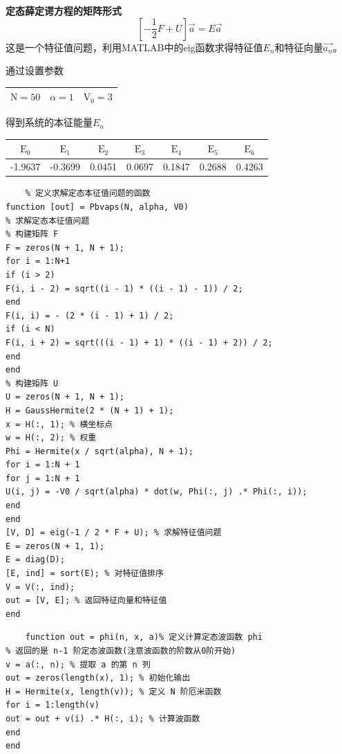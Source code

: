 \documentclass[aspectratio=169]{beamer}
\begin{document}
\begin{frame}{\textbf{定态薛定谔方程的矩阵形式}}
\begin{equation}
        \boxed{ \left[-\frac{1}{2}F+U\right]\vec{a}=E\vec{a}}
\end{equation}
    这是一个特征值问题，利用MATLAB中的eig函数求得特征值$E_n$和特征向量$\vec{a_n}$。
    \begin{exampleblock}{}
        \pause
    通过设置参数
    \begin{table}[h]
        \centering
        \begin{tabular}{|c|c|c|}
        \hline
        $\mathrm{N}=50$ & $\alpha=1$ & $\mathrm{V}_0=3$ \\
        \hline
        \end{tabular}
        
        得到系统的本征能量$E_n$
        \begin{tabular}{|c|c|c|c|c|c|c|}
        \hline
        $\mathrm{E}_0$ & $\mathrm{E}_1$ & $\mathrm{E}_2$ & $\mathrm{E}_3$ & $\mathrm{E}_4$ & $\mathrm{E}_5$ & $\mathrm{E}_6$ \\
        \hline
        -1.9637 & -0.3699 & 0.0451 & 0.0697 & 0.1847 & 0.2688 & 0.4263 \\
        \hline
        \end{tabular}
        \end{table}
    \end{exampleblock}
\end{frame}
\begin{lstlisting}
    % 定义求解定态本征值问题的函数
function [out] = Pbvaps(N, alpha, V0)
% 求解定态本征值问题
% 构建矩阵 F
F = zeros(N + 1, N + 1);
for i = 1:N+1
if (i > 2)
F(i, i - 2) = sqrt((i - 1) * ((i - 1) - 1)) / 2;
end
F(i, i) = - (2 * (i - 1) + 1) / 2;
if (i < N)
F(i, i + 2) = sqrt(((i - 1) + 1) * ((i - 1) + 2)) / 2;
end
end
% 构建矩阵 U
U = zeros(N + 1, N + 1);
H = GaussHermite(2 * (N + 1) + 1); 
x = H(:, 1); % 横坐标点
w = H(:, 2); % 权重
Phi = Hermite(x / sqrt(alpha), N + 1);
for i = 1:N + 1
for j = 1:N + 1
U(i, j) = -V0 / sqrt(alpha) * dot(w, Phi(:, j) .* Phi(:, i));
end
end
[V, D] = eig(-1 / 2 * F + U); % 求解特征值问题
E = zeros(N + 1, 1);
E = diag(D);
[E, ind] = sort(E); % 对特征值排序
V = V(:, ind);
out = [V, E]; % 返回特征向量和特征值
end

\end{lstlisting}
\begin{lstlisting}
    function out = phi(n, x, a)% 定义计算定态波函数 phi 
% 返回的是 n-1 阶定态波函数(注意波函数的阶数从0阶开始)
v = a(:, n); % 提取 a 的第 n 列
out = zeros(length(x), 1); % 初始化输出
H = Hermite(x, length(v)); % 定义 N 阶厄米函数
for i = 1:length(v)
out = out + v(i) .* H(:, i); % 计算波函数
end
end
\end{lstlisting}
\end{document}
